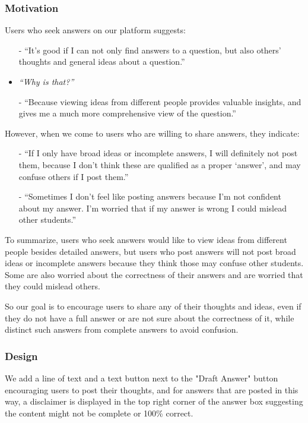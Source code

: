 \documentclass[a4paper]{article}
\begin{document}
    \subsubsection*{Motivation}
    \noindent Users who seek answers on our platform suggests:
    \begin{itemize}
        \item[-] ``It's good if I can not only find answers to a question, but also others' thoughts and general ideas about a question.''
        \item \textit{``Why is that?''}
        \item[-] ``Because viewing ideas from different people provides valuable insights, and gives me a much more comprehensive view of the question.''
    \end{itemize}
    \noindent However, when we come to users who are willing to share answers, they indicate:
    \begin{itemize}
        \item[-] ``If I only have broad ideas or incomplete answers, I will definitely not post them,
        because I don't think these are qualified as a proper `answer', and may confuse others if I post them.''
        \item[-] ``Sometimes I don't feel like posting answers because I'm not confident about my answer.
        I'm worried that if my answer is wrong I could mislead other students.''
    \end{itemize}

    To summarize, users who seek answers would like to view ideas from different people besides detailed answers,
    but users who post answers will not post broad ideas or incomplete answers because they think those may confuse other students.
    Some are also worried about the correctness of their answers and are worried that they could mislead others.

    So our goal is to encourage users to share any of their thoughts and ideas, even if they do not have a full answer
    or are not sure about the correctness of it, while distinct such answers from complete answers to avoid confusion.

    \subsubsection*{Design}
    We add a line of text and a text button next to the "Draft Answer" button encouraging users to post their thoughts,
    and for answers that are posted in this way, a disclaimer is displayed in the top right corner of the answer box
    suggesting the content might not be complete or 100\% correct.
\end{document}
